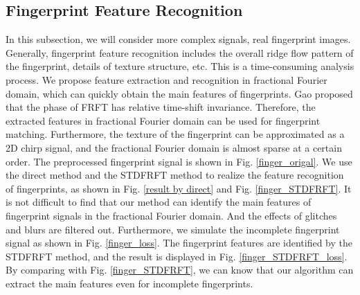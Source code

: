 \documentclass[conference]{IEEEtran}
\begin{document}
\subsection{Fingerprint Feature Recognition}
In this subsection, we will consider more complex signals, real fingerprint images. Generally, fingerprint feature recognition includes the overall ridge flow pattern of the fingerprint, details of texture structure, etc. This is a time-consuming analysis process. We propose feature extraction and recognition in fractional Fourier domain, which can quickly obtain the main features of fingerprints. Gao\cite{b3} proposed that the phase of FRFT has relative time-shift invariance. Therefore, the extracted features in fractional Fourier domain can be used for fingerprint matching. Furthermore, the texture of the fingerprint can be approximated as a 2D chirp signal, and the fractional Fourier domain is almost sparse at a certain order. The preprocessed fingerprint signal is shown in {Fig. \ref{finger_origal}}. We use the direct method and the STDFRFT method to realize the feature recognition of fingerprints, as shown {in Fig. \ref{result by direct} and Fig. \ref{finger_STDFRFT}.} It is not difficult to find that our method can identify the main features of fingerprint signals in the fractional Fourier domain. And the effects of glitches and blurs are filtered out. {Furthermore, we simulate the incomplete fingerprint signal as shown in Fig. \ref{finger_loss}. The fingerprint features are identified by the STDFRFT method, and the result is displayed in Fig. \ref{finger_STDFRFT_loss}. By comparing with Fig. \ref{finger_STDFRFT}, we can know that our algorithm can extract the main features even for incomplete fingerprints.}
\end{document}
